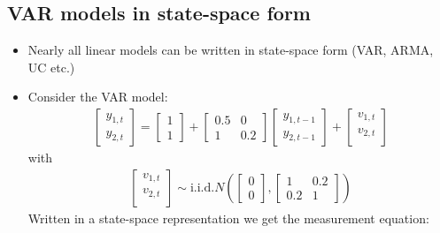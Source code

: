 \documentclass[10pt]{article}
\begin{document}
\subsection{VAR models in state-space form }
\begin{itemize}
    \item Nearly all linear models can be written in state-space form (VAR, ARMA, UC etc.)
    \item Consider the VAR model:
    \begin{gather*}
        \begin{bmatrix}
            y_{1, t}\\
            y_{2, t}
        \end{bmatrix}
        = \begin{bmatrix}
            1 \\ 1
        \end{bmatrix}
        + \begin{bmatrix}
            0.5 & 0 \\
            1 & 0.2
        \end{bmatrix}
        \begin{bmatrix}
            y_{1, t - 1}\\
            y_{2, t - 1}
        \end{bmatrix}
        + \begin{bmatrix}
            v_{1, t}\\
            v_{2, t}\\
        \end{bmatrix}
    \end{gather*}
    with 
    \begin{gather*}
        \begin{bmatrix}
            v_{1, t}\\
            v_{2, t}\\
        \end{bmatrix}
        \sim \text{i.i.d.} N\left(
            \begin{bmatrix}
                0 \\ 0
            \end{bmatrix},
            \begin{bmatrix}
                1 & 0.2 \\
                0.2 & 1
            \end{bmatrix}
        \right)
    \end{gather*}
    Written in a state-space representation we get the measurement equation: 
    \begin{gather}

\end{gather}
\end{itemize}
\end{document}
